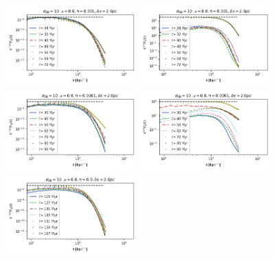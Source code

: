 \documentclass[iop,apj,numberedappendix,twocolappendix]{emulateapj}
\begin{document}

\begin{figure}
\centering
\includegraphics[trim=0.0cm 0.00cm 0.0cm 0.0cm,clip=true,width=0.45\textwidth]{csc_figs/2pcPm0e-3_02SNBpower.png}
\includegraphics[trim=0.0cm 0.00cm 0.0cm 0.0cm,clip=true,width=0.45\textwidth]{csc_figs/2pcPm0e-3_02SNkpower.png}
\includegraphics[trim=0.0cm 0.00cm 0.0cm 0.0cm,clip=true,width=0.45\textwidth]{csc_figs/2pcPm0e-4_02SNBpower.png}
\includegraphics[trim=0.0cm 0.00cm 0.0cm 0.0cm,clip=true,width=0.45\textwidth]{csc_figs/2pcPm0e-4_02SNkpower.png}
\includegraphics[trim=0.0cm 0.00cm 0.0cm 0.0cm,clip=true,width=0.45\textwidth]{csc_figs/2pcPm0e-0_02SNBpower.png}

\end{figure}
\end{document}
